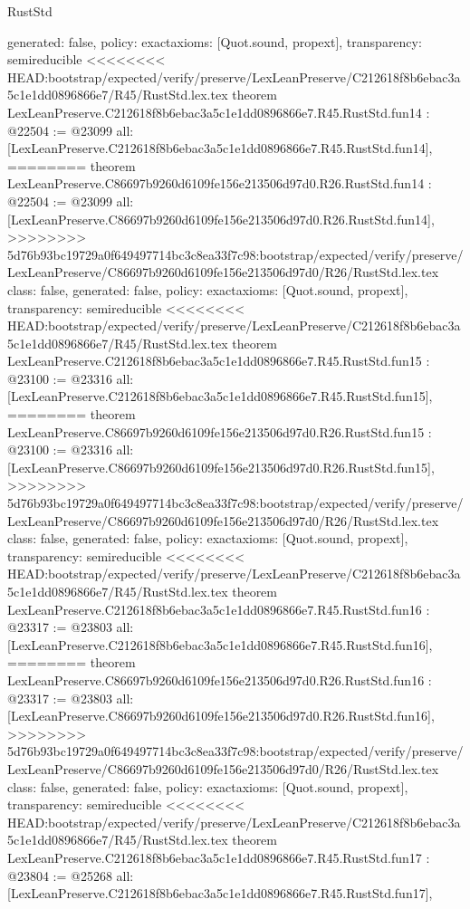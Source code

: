 \begin{lexlean}{RustStd}
\begin{coremodule}
{\begin{coremodule}
{{{{{{{{{{{{{{{{{  generated: false,
  policy: exact{axioms: [Quot.sound, propext]},
  transparency: semireducible
}
<<<<<<<< HEAD:bootstrap/expected/verify/preserve/LexLeanPreserve/C212618f8b6ebac3a5c1e1dd0896866e7/R45/RustStd.lex.tex
theorem LexLeanPreserve.C212618f8b6ebac3a5c1e1dd0896866e7.R45.RustStd.fun14 : @22504 := @23099 {
  all: [LexLeanPreserve.C212618f8b6ebac3a5c1e1dd0896866e7.R45.RustStd.fun14],
========
theorem LexLeanPreserve.C86697b9260d6109fe156e213506d97d0.R26.RustStd.fun14 : @22504 := @23099 {
  all: [LexLeanPreserve.C86697b9260d6109fe156e213506d97d0.R26.RustStd.fun14],
>>>>>>>> 5d76b93bc19729a0f649497714bc3c8ea33f7c98:bootstrap/expected/verify/preserve/LexLeanPreserve/C86697b9260d6109fe156e213506d97d0/R26/RustStd.lex.tex
  class: false,
  generated: false,
  policy: exact{axioms: [Quot.sound, propext]},
  transparency: semireducible
}
<<<<<<<< HEAD:bootstrap/expected/verify/preserve/LexLeanPreserve/C212618f8b6ebac3a5c1e1dd0896866e7/R45/RustStd.lex.tex
theorem LexLeanPreserve.C212618f8b6ebac3a5c1e1dd0896866e7.R45.RustStd.fun15 : @23100 := @23316 {
  all: [LexLeanPreserve.C212618f8b6ebac3a5c1e1dd0896866e7.R45.RustStd.fun15],
========
theorem LexLeanPreserve.C86697b9260d6109fe156e213506d97d0.R26.RustStd.fun15 : @23100 := @23316 {
  all: [LexLeanPreserve.C86697b9260d6109fe156e213506d97d0.R26.RustStd.fun15],
>>>>>>>> 5d76b93bc19729a0f649497714bc3c8ea33f7c98:bootstrap/expected/verify/preserve/LexLeanPreserve/C86697b9260d6109fe156e213506d97d0/R26/RustStd.lex.tex
  class: false,
  generated: false,
  policy: exact{axioms: [Quot.sound, propext]},
  transparency: semireducible
}
<<<<<<<< HEAD:bootstrap/expected/verify/preserve/LexLeanPreserve/C212618f8b6ebac3a5c1e1dd0896866e7/R45/RustStd.lex.tex
theorem LexLeanPreserve.C212618f8b6ebac3a5c1e1dd0896866e7.R45.RustStd.fun16 : @23317 := @23803 {
  all: [LexLeanPreserve.C212618f8b6ebac3a5c1e1dd0896866e7.R45.RustStd.fun16],
========
theorem LexLeanPreserve.C86697b9260d6109fe156e213506d97d0.R26.RustStd.fun16 : @23317 := @23803 {
  all: [LexLeanPreserve.C86697b9260d6109fe156e213506d97d0.R26.RustStd.fun16],
>>>>>>>> 5d76b93bc19729a0f649497714bc3c8ea33f7c98:bootstrap/expected/verify/preserve/LexLeanPreserve/C86697b9260d6109fe156e213506d97d0/R26/RustStd.lex.tex
  class: false,
  generated: false,
  policy: exact{axioms: [Quot.sound, propext]},
  transparency: semireducible
}
<<<<<<<< HEAD:bootstrap/expected/verify/preserve/LexLeanPreserve/C212618f8b6ebac3a5c1e1dd0896866e7/R45/RustStd.lex.tex
theorem LexLeanPreserve.C212618f8b6ebac3a5c1e1dd0896866e7.R45.RustStd.fun17 : @23804 := @25268 {
  all: [LexLeanPreserve.C212618f8b6ebac3a5c1e1dd0896866e7.R45.RustStd.fun17],
}}}}}}}}}}}}}}}}}}}}
\end{coremodule}}
\end{coremodule}
\end{lexlean}
